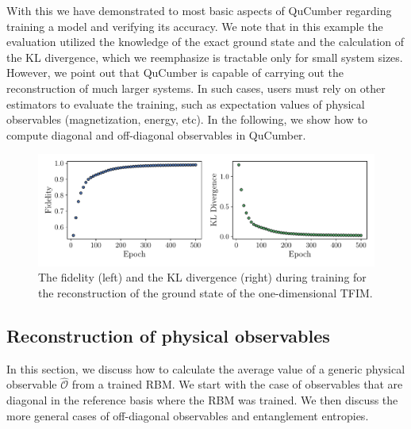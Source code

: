 \documentclass[submission, Phys, hidelnks]{SciPost}
\begin{document}
With this we have demonstrated to most basic aspects of QuCumber regarding
training a model and verifying its accuracy. We note that in this example the
evaluation utilized the knowledge of the exact ground state and the calculation
of the KL divergence, which we reemphasize is tractable only for small system sizes.  However,
we point out that QuCumber is capable of carrying out the reconstruction of much
larger systems. In such cases, users must rely on other estimators to evaluate
the training, such as expectation values of physical observables (magnetization,
energy, etc). In the following, we show how to compute diagonal and
off-diagonal observables in QuCumber.

\begin{figure}[hbt]
    \centering{}
    \includegraphics[width=\columnwidth, trim={0 15 0 0}, clip]{fid_KL.pdf}
    \caption{
        The fidelity (left) and the KL divergence (right) during training for
        the reconstruction of the ground state of the one-dimensional TFIM.\@
    }\label{fig:KL}
\end{figure}

\subsection{Reconstruction of physical observables}\label{Sec:Sampling_a-Trained_RBM}
In this section, we discuss how to calculate the average value of a generic
physical observable $\hat{\mathcal{O}}$ from a trained RBM.\@
We start with the case of observables that are diagonal in the reference basis
where the RBM was trained. We then discuss the more general cases of
off-diagonal observables and entanglement entropies.
\end{document}
